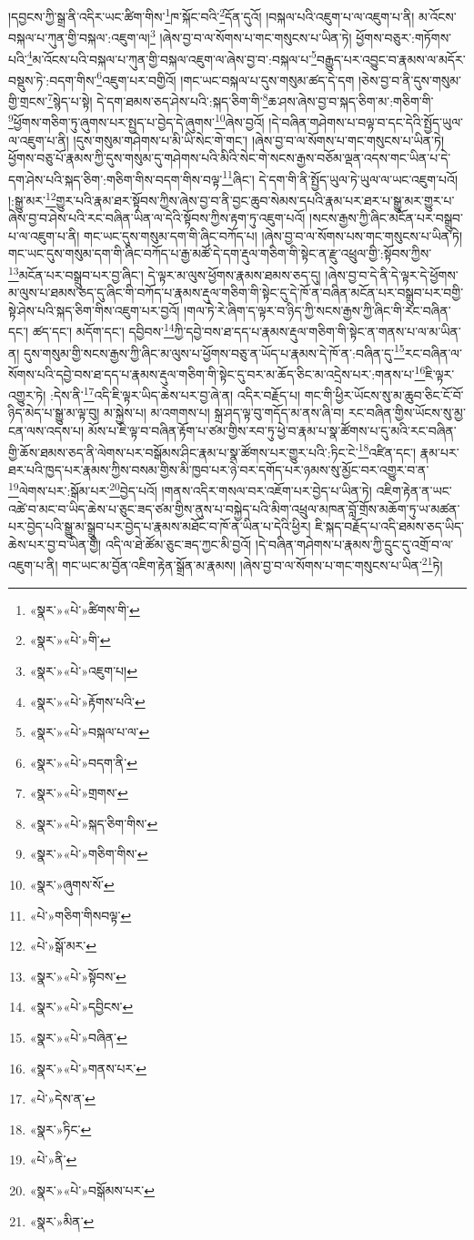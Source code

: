 །དབྱངས་ཀྱི་སྒྲ་ནི་འདིར་ཡང་ཚིག་གིས་\footnote{«སྣར་»«པེ་»ཚིགས་གི་}ཁ་སྐོང་བའི་\footnote{«སྣར་»«པེ་»གི་}དོན་དུའོ། །བསྐལ་པའི་འཇུག་པ་ལ་འཇུག་པ་ནི། མ་འོངས་བསྐལ་པ་ཀུན་གྱི་བསྐལ་:འཇུག་ལ།\footnote{«སྣར་»«པེ་»འཇུག་པ།} །ཞེས་བྱ་བ་ལ་སོགས་པ་གང་གསུངས་པ་ཡིན་ཏེ། ཕྱོགས་བཅུར་:གཏོགས་པའི་\footnote{«སྣར་»«པེ་»རྟོགས་པའི་}མ་འོངས་པའི་བསྐལ་པ་ཀུན་གྱི་བསྐལ་འཇུག་ལ་ཞེས་བྱ་བ་:བསྐལ་པ་\footnote{«སྣར་»«པེ་»བསྐལ་པ་ལ་}བརྒྱུད་པར་འབྱུང་བ་རྣམས་ལ་མདོར་བསྡུས་ཏེ་:བདག་གིས་\footnote{«སྣར་»«པེ་»བདག་ནི་}འཇུག་པར་བགྱིའོ། །གང་ཡང་བསྐལ་པ་དུས་གསུམ་ཚད་དེ་དག །ཅེས་བྱ་བ་ནི་དུས་གསུམ་གྱི་གྲངས་\footnote{«སྣར་»«པེ་»གྲགས་}སྙེད་པ་སྟེ། དེ་དག་ཐམས་ཅད་ཤེས་པའི་:སྐད་ཅིག་གི་\footnote{«སྣར་»«པེ་»སྐད་ཅིག་གིས་}ཆ་ཤས་ཞེས་བྱ་བ་སྐད་ཅིག་མ་:གཅིག་གི་\footnote{«སྣར་»«པེ་»གཅིག་གིས་}ཕྱོགས་གཅིག་ཏུ་ཞུགས་པར་སྤྱད་པ་བྱེད་དེ་ཞུགས་\footnote{«སྣར་»ཞུགས་སོ་}ཞེས་བྱའོ། །དེ་བཞིན་གཤེགས་པ་བལྟ་བ་དང་དེའི་སྤྱོད་ཡུལ་ལ་འཇུག་པ་ནི། །དུས་གསུམ་གཤེགས་པ་མི་ཡི་སེང་གེ་གང་། །ཞེས་བྱ་བ་ལ་སོགས་པ་གང་གསུངས་པ་ཡིན་ཏེ། ཕྱོགས་བཅུ་པོ་རྣམས་ཀྱི་དུས་གསུམ་དུ་གཤེགས་པའི་མིའི་སེང་གེ་སངས་རྒྱས་བཅོམ་ལྡན་འདས་གང་ཡིན་པ་དེ་དག་ཤེས་པའི་སྐད་ཅིག་:གཅིག་གིས་བདག་གིས་བལྟ་\footnote{«པེ་»གཅིག་གིསབལྟ་}ཞིང་། དེ་དག་གི་ནི་སྤྱོད་ཡུལ་ཏེ་ཡུལ་ལ་ཡང་འཇུག་པའོ། །:སྒྱུ་མར་\footnote{«པེ་»སྒོ་མར་}གྱུར་པའི་རྣམ་ཐར་སྟོབས་ཀྱིས་ཞེས་བྱ་བ་ནི་བྱང་ཆུབ་སེམས་དཔའི་རྣམ་པར་ཐར་པ་སྒྱུ་མར་གྱུར་པ་ཞེས་བྱ་བ་ཤེས་པའི་རང་བཞིན་ཡིན་ལ་དེའི་སྟོབས་ཀྱིས་རྟག་ཏུ་འཇུག་པའོ། །སངས་རྒྱས་ཀྱི་ཞིང་མངོན་པར་བསྒྲུབ་པ་ལ་འཇུག་པ་ནི། གང་ཡང་དུས་གསུམ་དག་གི་ཞིང་བཀོད་པ། །ཞེས་བྱ་བ་ལ་སོགས་པས་གང་གསུངས་པ་ཡིན་ཏེ། གང་ཡང་དུས་གསུམ་དག་གི་ཞིང་བཀོད་པ་རྒྱ་མཚོ་དེ་དག་རྡུལ་གཅིག་གི་སྟེང་ན་རྫུ་འཕྲུལ་གྱི་:སྟོབས་ཀྱིས་\footnote{«སྣར་»«པེ་»སྟོབས་}མངོན་པར་བསྒྲུབ་པར་བྱ་ཞིང་། དེ་ལྟར་མ་ལུས་ཕྱོགས་རྣམས་ཐམས་ཅད་དུ། །ཞེས་བྱ་བ་དེ་ནི་དེ་ལྟར་དེ་ཕྱོགས་མ་ལུས་པ་ཐམས་ཅད་དུ་ཞིང་གི་བཀོད་པ་རྣམས་རྡུལ་གཅིག་གི་སྟེང་དུ་དེ་ཁོ་ན་བཞིན་མངོན་པར་བསྒྲུབ་པར་བགྱི་སྟེ་ཤེས་པའི་སྐད་ཅིག་གིས་འཇུག་པར་བྱའོ། །གལ་ཏེ་རེ་ཞིག་ད་ལྟར་བ་ཉིད་ཀྱི་སངས་རྒྱས་ཀྱི་ཞིང་གི་རང་བཞིན་དང་། ཚད་དང་། མདོག་དང་། དབྱིབས་\footnote{«སྣར་»«པེ་»དབྱིངས་}ཀྱི་དབྱེ་བས་ཐ་དད་པ་རྣམས་རྡུལ་གཅིག་གི་སྟེང་ན་གནས་པ་ལ་མ་ཡིན་ན། དུས་གསུམ་གྱི་སངས་རྒྱས་ཀྱི་ཞིང་མ་ལུས་པ་ཕྱོགས་བཅུ་ན་ཡོད་པ་རྣམས་དེ་ཁོ་ན་:བཞིན་དུ་\footnote{«སྣར་»«པེ་»བཞིན་}རང་བཞིན་ལ་སོགས་པའི་དབྱེ་བས་ཐ་དད་པ་རྣམས་རྡུལ་གཅིག་གི་སྟེང་དུ་བར་མ་ཆོད་ཅིང་མ་འདྲེས་པར་:གནས་པ་\footnote{«སྣར་»«པེ་»གནས་པར་}ཇི་ལྟར་འགྱུར་ཏེ། :དེས་ནི་\footnote{«པེ་»དེས་ན་}འདི་ཇི་ལྟར་ཡིད་ཆེས་པར་བྱ་ཞེ་ན། འདིར་བརྗོད་པ། གང་གི་ཕྱིར་ཡོངས་སུ་མ་ཆུབ་ཅིང་ངོ་བོ་ཉིད་མེད་པ་སྒྱུ་མ་ལྟ་བུ། མ་སྐྱེས་པ། མ་འགགས་པ། སྐྲ་ཤད་ལྟ་བུ་གདོད་མ་ནས་ཞི་བ། རང་བཞིན་གྱིས་ཡོངས་སུ་མྱ་ངན་ལས་འདས་པ། མོས་པ་ཇི་ལྟ་བ་བཞིན་རྟོག་པ་ཙམ་གྱིས་རབ་ཏུ་ཕྱེ་བ་རྣམ་པ་སྣ་ཚོགས་པ་དུ་མའི་རང་བཞིན་གྱི་ཆོས་ཐམས་ཅད་ནི་ལེགས་པར་བསྒོམས་ཤིང་རྣམ་པ་སྣ་ཚོགས་པར་གྱུར་པའི་:ཏིང་ངེ་\footnote{«སྣར་»ཏིང་}འཛིན་དང་། རྣམ་པར་ཐར་པའི་ཁྱད་པར་རྣམས་ཀྱིས་བསམ་གྱིས་མི་ཁྱབ་པར་ཉེ་བར་དགོད་པར་ཉམས་སུ་མྱོང་བར་འགྱུར་བ་ན་\footnote{«པེ་»ནི་}ལེགས་པར་:སྒོམ་པར་\footnote{«སྣར་»«པེ་»བསྒོམས་པར་}བྱེད་པའོ། །གནས་འདིར་གསལ་བར་འཇོག་པར་བྱེད་པ་ཡིན་ཏེ། འཇིག་རྟེན་ན་ཡང་འཚེ་བ་མང་བ་ཡིད་ཆེས་པ་ཅུང་ཟད་ཙམ་གྱིས་ནུས་པ་བསྐྱེད་པའི་མིག་འཕྲུལ་མཁན་བློ་གྲོས་མཆོག་ཏུ་ཡ་མཚན་པར་བྱེད་པའི་སྒྱུ་མ་སྒྲུབ་པར་བྱེད་པ་རྣམས་མཐོང་བ་ཁོ་ན་ཡིན་པ་དེའི་ཕྱིར། ཇི་སྐད་བརྗོད་པ་འདི་ཐམས་ཅད་ཡིད་ཆེས་པར་བྱ་བ་ཡིན་གྱི། འདི་ལ་ཐེ་ཚོམ་ཅུང་ཟད་ཀྱང་མི་བྱའོ། །དེ་བཞིན་གཤེགས་པ་རྣམས་ཀྱི་དྲུང་དུ་འགྲོ་བ་ལ་འཇུག་པ་ནི། གང་ཡང་མ་བྱོན་འཇིག་རྟེན་སྒྲོན་མ་རྣམས། །ཞེས་བྱ་བ་ལ་སོགས་པ་གང་གསུངས་པ་ཡིན་\footnote{«སྣར་»མིན་}ཏེ། 